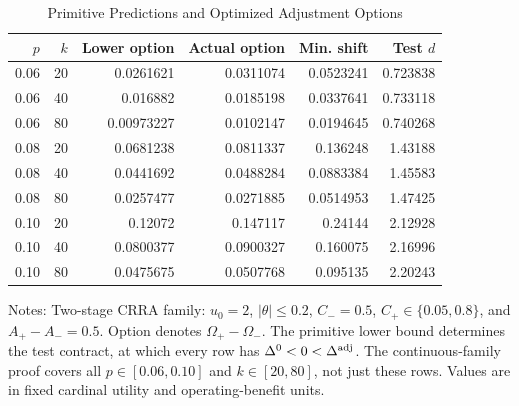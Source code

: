 \begin{table}[!htbp]
\centering\small
\caption{Primitive Predictions and Optimized Adjustment Options}
\label{tab:r7_primitive}
\begin{tabular}{rrrrrr}
\toprule
$p$ & $k$ & Lower option & Actual option & Min. shift & Test $d$ \\
\midrule
0.06 & 20 & 0.0261621 & 0.0311074 & 0.0523241 & 0.723838 \\
0.06 & 40 & 0.016882 & 0.0185198 & 0.0337641 & 0.733118 \\
0.06 & 80 & 0.00973227 & 0.0102147 & 0.0194645 & 0.740268 \\
0.08 & 20 & 0.0681238 & 0.0811337 & 0.136248 & 1.43188 \\
0.08 & 40 & 0.0441692 & 0.0488284 & 0.0883384 & 1.45583 \\
0.08 & 80 & 0.0257477 & 0.0271885 & 0.0514953 & 1.47425 \\
0.10 & 20 & 0.12072 & 0.147117 & 0.24144 & 2.12928 \\
0.10 & 40 & 0.0800377 & 0.0900327 & 0.160075 & 2.16996 \\
0.10 & 80 & 0.0475675 & 0.0507768 & 0.095135 & 2.20243 \\
\bottomrule
\end{tabular}
\par\smallskip
\begin{minipage}{0.98\linewidth}\footnotesize
Notes: Two-stage CRRA family: $u_0=2$, $|\theta|\leq0.2$, $C_-=0.5$, $C_+\in\{0.05,0.8\}$, and $A_+-A_-=0.5$. Option denotes $\Omega_+-\Omega_-$. The primitive lower bound determines the test contract, at which every row has $\Delta^0<0<\Delta^{\rm adj}$. The continuous-family proof covers all $p\in[0.06,0.10]$ and $k\in[20,80]$, not just these rows. Values are in fixed cardinal utility and operating-benefit units.
\end{minipage}
\end{table}
